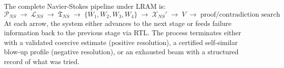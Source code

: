 The complete Navier-Stokes pipeline under LRAM is:
\[
\mathcal{P}_{NS}
\;\rightarrow\; \mathcal{L}_{NS}
\;\rightarrow\; \mathfrak{T}_{NS}
\;\rightarrow\; \{W_1, W_2, W_3, W_4\}
\;\rightarrow\; \mathcal{X}_{NS}'
\;\rightarrow\; V
\;\rightarrow\; \text{proof/contradiction search}
\]
At each arrow, the system either advances to the next stage or feeds failure information back to the previous stage via RTL. The process terminates either with a validated coercive estimate (positive resolution), a certified self-similar blow-up profile (negative resolution), or an exhausted beam with a structured record of what was tried.
